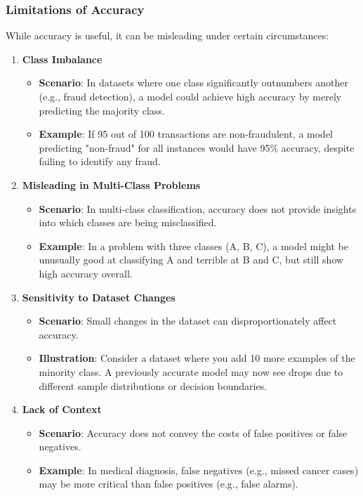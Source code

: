 \documentclass[aspectratio=169]{beamer}
\begin{document}
\begin{frame}[fragile]
    \frametitle{Limitations of Accuracy}
    While accuracy is useful, it can be misleading under certain circumstances:
    \begin{enumerate}
        \item \textbf{Class Imbalance}
            \begin{itemize}
                \item \textbf{Scenario}: In datasets where one class significantly outnumbers another (e.g., fraud detection), a model could achieve high accuracy by merely predicting the majority class.
                \item \textbf{Example}: If 95 out of 100 transactions are non-fraudulent, a model predicting "non-fraud" for all instances would have 95\% accuracy, despite failing to identify any fraud.
            \end{itemize}

        \item \textbf{Misleading in Multi-Class Problems}
            \begin{itemize}
                \item \textbf{Scenario}: In multi-class classification, accuracy does not provide insights into which classes are being misclassified.
                \item \textbf{Example}: In a problem with three classes (A, B, C), a model might be unusually good at classifying A and terrible at B and C, but still show high accuracy overall.
            \end{itemize}
			
        \item \textbf{Sensitivity to Dataset Changes}
            \begin{itemize}
                \item \textbf{Scenario}: Small changes in the dataset can disproportionately affect accuracy.
                \item \textbf{Illustration}: Consider a dataset where you add 10 more examples of the minority class. A previously accurate model may now see drops due to different sample distributions or decision boundaries.
            \end{itemize}    

        \item \textbf{Lack of Context}
            \begin{itemize}
                \item \textbf{Scenario}: Accuracy does not convey the costs of false positives or false negatives.
                \item \textbf{Example}: In medical diagnosis, false negatives (e.g., missed cancer cases) may be more critical than false positives (e.g., false alarms).
            \end{itemize}
    \end{enumerate}
\end{frame}
\end{document}
